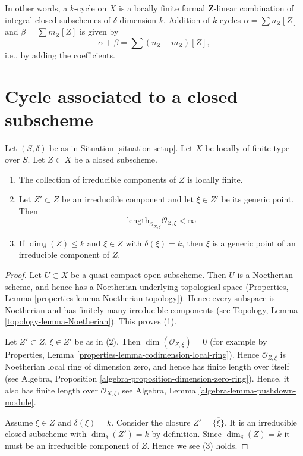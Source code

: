 \noindent
In other words, a $k$-cycle on $X$
is a locally finite formal $\mathbf{Z}$-linear
combination of integral closed subschemes of $\delta$-dimension $k$.
Addition of $k$-cycles $\alpha = \sum n_Z[Z]$ and
$\beta = \sum m_Z[Z]$ is given by
$$
\alpha + \beta = \sum (n_Z + m_Z)[Z],
$$
i.e., by adding the coefficients.




\section{Cycle associated to a closed subscheme}
\label{section-cycle-of-closed-subscheme}

\begin{lemma}
\label{lemma-multiplicity-finite}
Let $(S, \delta)$ be as in Situation \ref{situation-setup}.
Let $X$ be locally of finite type over $S$.
Let $Z \subset X$ be a closed subscheme.
\begin{enumerate}
\item The collection of irreducible components of $Z$
is locally finite.
\item Let $Z' \subset Z$ be an irreducible component and
let $\xi \in Z'$ be its generic point.
Then
$$
\text{length}_{\mathcal{O}_{X, \xi}} \mathcal{O}_{Z, \xi} < \infty
$$
\item If $\dim_\delta(Z) \leq k$ and $\xi \in Z$ with
$\delta(\xi) = k$, then $\xi$ is a generic point of an
irreducible component of $Z$.
\end{enumerate}
\end{lemma}

\begin{proof}
Let $U \subset X$ be a quasi-compact open subscheme.
Then $U$ is a Noetherian scheme, and hence has a Noetherian
underlying topological space
(Properties, Lemma \ref{properties-lemma-Noetherian-topology}).
Hence every subspace is Noetherian and
has finitely many irreducible components
(see Topology, Lemma \ref{topology-lemma-Noetherian}).
This proves (1).

\medskip\noindent
Let $Z' \subset Z$, $\xi \in Z'$ be as in (2).
Then $\dim(\mathcal{O}_{Z, \xi}) = 0$ (for example by
Properties, Lemma \ref{properties-lemma-codimension-local-ring}).
Hence $\mathcal{O}_{Z, \xi}$ is Noetherian
local ring of dimension zero, and hence has finite length over
itself (see
Algebra, Proposition \ref{algebra-proposition-dimension-zero-ring}).
Hence, it also has finite length over $\mathcal{O}_{X, \xi}$, see
Algebra, Lemma \ref{algebra-lemma-pushdown-module}.

\medskip\noindent
Assume $\xi \in Z$ and $\delta(\xi) = k$.
Consider the closure $Z' = \overline{\{\xi\}}$. It is an irreducible
closed subscheme with $\dim_\delta(Z') = k$ by definition.
Since $\dim_\delta(Z) = k$ it must be an irreducible component
of $Z$. Hence we see (3) holds.
\end{proof}

